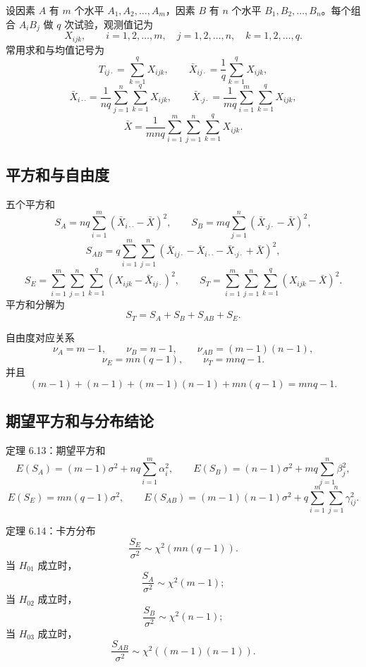 \documentclass[UTF8,zihao=-4,fontset=fandol]{ctexart}
\begin{document}
设因素 $A$ 有 $m$ 个水平 $A_1,A_2,\ldots,A_m$，因素 $B$ 有 $n$ 个水平 $B_1,B_2,\ldots,B_n$。每个组合 $A_iB_j$ 做 $q$ 次试验，观测值记为
\[
X_{ijk},\qquad
i=1,2,\ldots,m,\quad j=1,2,\ldots,n,\quad k=1,2,\ldots,q.
\]
常用求和与均值记号为
\[
T_{ij\cdot}=\sum_{k=1}^{q}X_{ijk},\qquad
\bar X_{ij\cdot}=\frac{1}{q}\sum_{k=1}^{q}X_{ijk},
\]
\[
\bar X_{i\cdot\cdot}
=\frac{1}{nq}\sum_{j=1}^{n}\sum_{k=1}^{q}X_{ijk},
\qquad
\bar X_{\cdot j\cdot}
=\frac{1}{mq}\sum_{i=1}^{m}\sum_{k=1}^{q}X_{ijk},
\]
\[
\bar X
=\frac{1}{mnq}\sum_{i=1}^{m}\sum_{j=1}^{n}\sum_{k=1}^{q}X_{ijk}.
\]

\subsection{平方和与自由度}

\begin{keybox}{五个平方和}
\[
S_A=nq\sum_{i=1}^{m}(\bar X_{i\cdot\cdot}-\bar X)^2,
\qquad
S_B=mq\sum_{j=1}^{n}(\bar X_{\cdot j\cdot}-\bar X)^2,
\]
\[
S_{AB}
=q\sum_{i=1}^{m}\sum_{j=1}^{n}
(\bar X_{ij\cdot}-\bar X_{i\cdot\cdot}-\bar X_{\cdot j\cdot}+\bar X)^2,
\]
\[
S_E
=\sum_{i=1}^{m}\sum_{j=1}^{n}\sum_{k=1}^{q}
(X_{ijk}-\bar X_{ij\cdot})^2,
\qquad
S_T
=\sum_{i=1}^{m}\sum_{j=1}^{n}\sum_{k=1}^{q}
(X_{ijk}-\bar X)^2.
\]
平方和分解为
\[
S_T=S_A+S_B+S_{AB}+S_E.
\]
\end{keybox}

\begin{methodbox}{自由度对应关系}
\[
\nu_A=m-1,\qquad
\nu_B=n-1,\qquad
\nu_{AB}=(m-1)(n-1),
\]
\[
\nu_E=mn(q-1),\qquad
\nu_T=mnq-1.
\]
并且
\[
(m-1)+(n-1)+(m-1)(n-1)+mn(q-1)=mnq-1.
\]
\end{methodbox}

\subsection{期望平方和与分布结论}

\begin{keybox}{定理 6.13：期望平方和}
\[
E(S_A)=(m-1)\sigma^2+nq\sum_{i=1}^{m}\alpha_i^2,
\qquad
E(S_B)=(n-1)\sigma^2+mq\sum_{j=1}^{n}\beta_j^2,
\]
\[
E(S_E)=mn(q-1)\sigma^2,
\qquad
E(S_{AB})=(m-1)(n-1)\sigma^2
+q\sum_{i=1}^{m}\sum_{j=1}^{n}\gamma_{ij}^{2}.
\]
\end{keybox}

\begin{keybox}{定理 6.14：卡方分布}
\[
\frac{S_E}{\sigma^2}\sim\chi^2(mn(q-1)).
\]
当 $H_{01}$ 成立时，
\[
\frac{S_A}{\sigma^2}\sim\chi^2(m-1);
\]
当 $H_{02}$ 成立时，
\[
\frac{S_B}{\sigma^2}\sim\chi^2(n-1);
\]
当 $H_{03}$ 成立时，
\[
\frac{S_{AB}}{\sigma^2}\sim\chi^2((m-1)(n-1)).
\]
\end{keybox}
\end{document}
